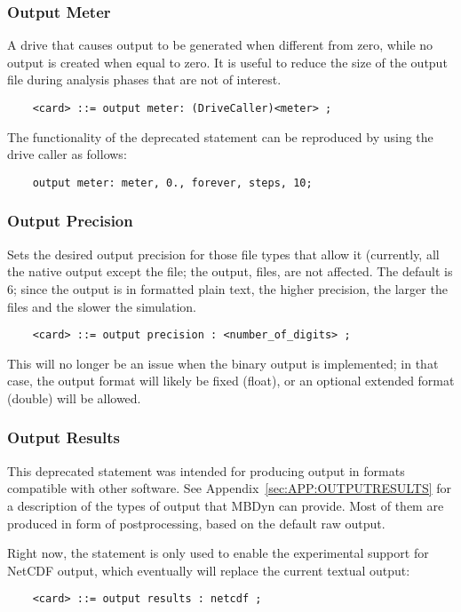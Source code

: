 \subsubsection{Output Meter}
\label{sec:CONTROLDATA:OUTPUTMETER}
A drive that causes output to be generated when different from zero,
while no output is created when equal to zero.  It is useful to reduce 
the size of the output file during analysis phases that are not of interest.
\begin{verbatim}
    <card> ::= output meter: (DriveCaller)<meter> ;
\end{verbatim}
The functionality of the deprecated  statement
can be reproduced by using the  drive caller as follows:
\begin{verbatim}
    output meter: meter, 0., forever, steps, 10;
\end{verbatim}

\subsubsection{Output Precision}
Sets the desired output precision for those file types that allow it
(currently, all the native output except the  file; the
 output,  files, are not affected.
The default is 6; since the output is in formatted plain text, the higher
precision, the larger the files and the slower the simulation.
\begin{verbatim}
    <card> ::= output precision : <number_of_digits> ;
\end{verbatim}
This will no longer be an issue when the binary output is implemented;
in that case, the output format will likely be fixed (float), or
an optional extended format (double) will be allowed.

\subsubsection{Output Results}
This deprecated statement was intended for producing output in formats
compatible with other software.
See Appendix~\ref{sec:APP:OUTPUTRESULTS} for a description of the types
of output that MBDyn can provide.
Most of them are produced in form of postprocessing, based on the default
raw output.

Right now, the  statement is only used to enable
the experimental support for NetCDF output, which eventually
will replace the current textual output:
\begin{verbatim}
    <card> ::= output results : netcdf ;
\end{verbatim}

